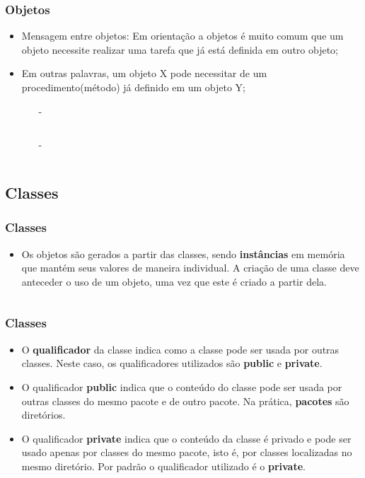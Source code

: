 \documentclass{beamer}
\begin{document}
\begin{frame}
	\frametitle{Objetos}
	\begin{itemize}
		\item Mensagem entre objetos: Em orientação a objetos é muito comum que um objeto necessite realizar uma tarefa que já está definida em outro objeto;
		\item Em outras palavras, um objeto X pode necessitar de um procedimento(método) já definido em um objeto Y;
		\begin{itemize}
			\item[-] \inputminted{java}{codigos/Objetos01.java}
			\item[-] \inputminted{java}{codigos/Objetos02.java}
		\end{itemize}		
	\end{itemize}
\end{frame}


\subsection{Classes}

\begin{frame}
	\frametitle{Classes}
	\begin{itemize}
		\item Os objetos são gerados a partir das classes, sendo \textbf{instâncias} em memória que mantém seus valores de maneira individual. A criação de uma classe deve anteceder o uso de um objeto, uma vez que este é criado a partir dela.
	\end{itemize}
	\inputminted{java}{codigos/Classes01.java}
\end{frame}
\begin{frame}
	\frametitle{Classes}
	\begin{itemize}
		\item O \textbf{qualificador} da classe indica como a classe pode ser usada por outras classes. Neste caso, os qualificadores utilizados são \textbf{public} e \textbf{private}.
		\item O qualificador \textbf{public} indica que o conteúdo do classe pode ser usada por outras classes do mesmo pacote e de outro pacote. Na prática, \textbf{pacotes} são diretórios.
		\item O qualificador \textbf{private} indica que o conteúdo da classe é privado e pode ser usado apenas por classes do mesmo pacote, isto é, por classes localizadas no mesmo diretório. Por padrão o qualificador utilizado é o \textbf{private}.
	\end{itemize}
\end{frame}
\end{document}
